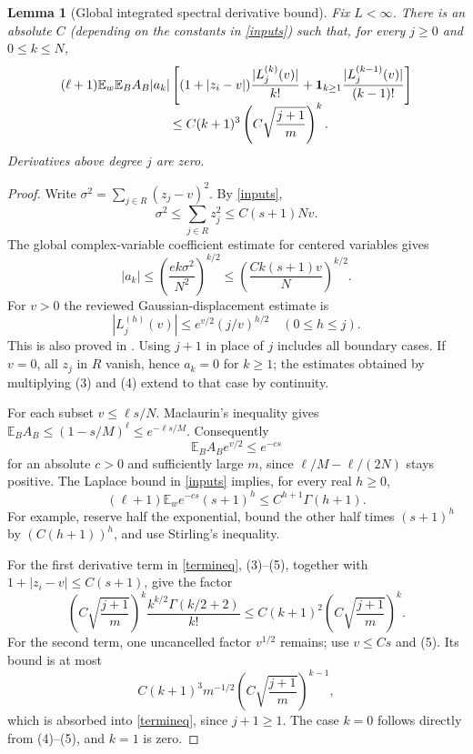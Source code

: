 \documentclass[11pt]{article}
\newtheorem{lemma}{Lemma}\newtheorem{theorem}{Theorem}
\newcommand{\E}{\mathbb E}
\begin{document}
\begin{lemma}[Global integrated spectral derivative bound]\label{term}
Fix $L<\infty$. There is an absolute $C$ (depending on the constants
in \eqref{inputs}) such that, for every $j\ge0$ and $0\le k\le N$,
\begin{align}
 &(\ell+1)\E_w\E_B A_B|a_k|
 \left[(1+|z_i-v|)\frac{|L_j^{(k)}(v)|}{k!}
 +\boldsymbol1_{k\ge1}\frac{|L_j^{(k-1)}(v)|}{(k-1)!}\right]
 \notag\\[-2mm]
 &\hspace{30mm}\le C(k+1)^3
       \left(C\sqrt{\frac{j+1}{m}}\right)^k .             \label{termineq}
\end{align}
Derivatives above degree $j$ are zero.
\end{lemma}
\begin{proof}
Write $\sigma^2=\sum_{j\in R}(z_j-v)^2$. By \eqref{inputs},
\[
 \sigma^2\le\sum_{j\in R}z_j^2\le C(s+1)Nv.
\]
The global complex-variable coefficient estimate for centered
variables gives
\[
 |a_k|\le\left(\frac{e k\sigma^2}{N^2}\right)^{k/2}
 \le\left(\frac{Ck(s+1)v}{N}\right)^{k/2}.                \tag{3}
\]
For $v>0$ the reviewed Gaussian-displacement estimate is
\[
 |L_j^{(h)}(v)|\le e^{v/2}(j/v)^{h/2}\quad(0\le h\le j).
                                                                    \tag{4}
\]
This is also proved in
.
Using $j+1$ in place of $j$ includes all boundary cases.
If $v=0$, all $z_j$ in $R$ vanish, hence $a_k=0$ for $k\ge1$;
the estimates obtained by multiplying (3) and (4) extend to that case
by continuity.

For each subset $v\le\ell s/N$. Maclaurin's inequality gives
$\E_BA_B\le(1-s/M)^\ell\le e^{-\ell s/M}$. Consequently
\[
 \E_B A_B e^{v/2}\le e^{-c s}
\]
for an absolute $c>0$ and sufficiently large $m$, since
$\ell/M-\ell/(2N)$ stays positive. The Laplace bound in
\eqref{inputs} implies, for every real $h\ge0$,
\[
 (\ell+1)\E_w e^{-c s}(s+1)^h
       \le C^{h+1}\Gamma(h+1).                            \tag{5}
\]
For example, reserve half the exponential, bound the other half times
$(s+1)^h$ by $(C(h+1))^h$, and use Stirling's inequality.

For the first derivative term in \eqref{termineq}, (3)--(5), together
with $1+|z_i-v|\le C(s+1)$, give the factor
\[
 \left(C\sqrt{\frac{j+1}{m}}\right)^k
       \frac{k^{k/2}\Gamma(k/2+2)}{k!}
 \le C(k+1)^2\left(C\sqrt{\frac{j+1}{m}}\right)^k.
\]
For the second term, one uncancelled factor $v^{1/2}$ remains;
use $v\le C s$ and (5). Its bound is at most
\[
 C(k+1)^3m^{-1/2}
       \left(C\sqrt{\frac{j+1}{m}}\right)^{k-1},
\]
which is absorbed into \eqref{termineq}, since $j+1\ge1$.
The case $k=0$ follows directly from (4)--(5), and $k=1$ is zero.
\end{proof}
\end{document}
